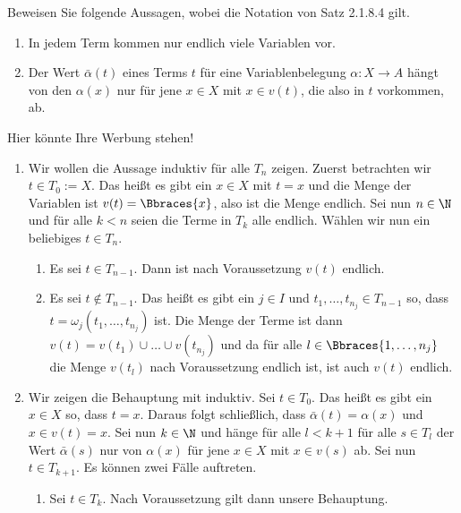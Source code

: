 \begin{exercise}
    Beweisen Sie folgende Aussagen, wobei die Notation von Satz 2.1.8.4 gilt. 
    \begin{enumerate}[label = \arabic*.]
        \item In jedem Term kommen  nur endlich viele Variablen vor.
        \item Der Wert $\bar{\alpha}(t)$ eines Terms $t$ für eine Variablenbelegung $\alpha: X \to A$ hängt von den $\alpha(x)$ nur für jene $x \in X$ mit $x \in v(t)$, die also in $t$ vorkommen, ab.
    \end{enumerate}
\end{exercise}

\begin{solution} 
    Hier könnte Ihre Werbung stehen!
    \begin{enumerate}[label = \arabic*.]
        \item Wir wollen die Aussage induktiv für alle $T_n$ zeigen. Zuerst betrachten wir $t \in T_0 := X$. Das heißt es gibt ein $x \in X$ mit $t = x$ und die Menge der Variablen ist $v(t) = \Bbraces{x}$, also ist die Menge endlich. Sei nun $n \in \N$ und für alle $k < n$ seien die Terme in $T_k$ alle endlich. Wählen wir nun ein beliebiges $t \in T_n$. 
        \begin{enumerate}[label = Fall \arabic*:]
            \item Es sei $t \in T_{n-1}$. Dann ist nach Voraussetzung $v(t)$ endlich.
            \item Es sei $t \notin T_{n-1}$. Das heißt es gibt ein $j \in I$ und $t_1, \dots, t_{n_j} \in T_{n-1}$ so, dass $t = \omega_j(t_1, \dots, t_{n_j})$ ist. Die Menge der Terme ist dann $v(t) = v(t_1) \cup \dots \cup v(t_{n_j})$ und da für alle $l \in \Bbraces{1, \dots, n_j}$ die Menge $v(t_l)$ nach Voraussetzung endlich ist, ist auch $v(t)$ endlich. 
        \end{enumerate}
        \item Wir zeigen die Behauptung mit induktiv. Sei $t \in T_0$. Das heißt es gibt ein $x \in X$ so, dass $t = x$. Daraus folgt schließlich, dass $\bar{\alpha}(t) = \alpha(x)$ und $x \in v(t) = {x}$. Sei nun $k \in \N$ und hänge für alle $l < k+1$ für alle $s \in T_l$ der Wert $\bar{\alpha}(s)$ nur von $\alpha(x)$ für jene $x \in X$ mit $x \in v(s)$ ab. Sei nun $t \in T_{k+1}$. Es können zwei Fälle auftreten.
        \begin{enumerate}[label = Fall \arabic*:]
            \item Sei $t \in T_k$. Nach Voraussetzung gilt dann unsere Behauptung.

\end{enumerate}
\end{enumerate}
\end{solution}
